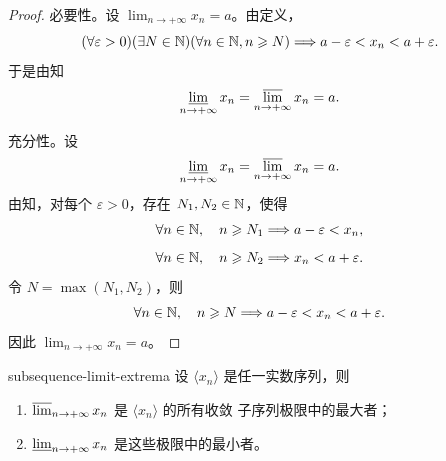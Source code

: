 \begin{proof}
必要性。设 \(\lim_{n\to+\infty}x_n=a\)。由定义，
\[
(\forall\varepsilon>0)(\exists N\in\mathbb{N})(\forall n\in\mathbb{N}, n\geqslant N)
\Longrightarrow a-\varepsilon<x_n<a+\varepsilon.
\]
于是由知
\[
\varliminf_{n\to+\infty}x_n
=\varlimsup_{n\to+\infty}x_n=a.
\]

充分性。设
\[
\varliminf_{n\to+\infty}x_n
=\varlimsup_{n\to+\infty}x_n=a.
\]
由知，对每个
\(\varepsilon>0\)，存在 \(N_1,N_2\in\mathbb{N}\)，使得
\[
\forall n\in\mathbb{N},\quad n\geqslant N_1\Longrightarrow a-\varepsilon<x_n,
\]
\[
\forall n\in\mathbb{N},\quad n\geqslant N_2\Longrightarrow x_n<a+\varepsilon.
\]
令 \(N=\max(N_1,N_2)\)，则
\[
\forall n\in\mathbb{N},\quad n\geqslant N
\Longrightarrow a-\varepsilon<x_n<a+\varepsilon.
\]
因此 \(\lim_{n\to+\infty}x_n=a\)。
\end{proof}

\begin{mythm}{}{subsequence-limit-extrema}
设 \(\langle x_n\rangle\) 是任一实数序列，则
\begin{enumerate}[label=\arabic*)]
  \item \(\varlimsup_{n\to+\infty}x_n\) 是 \(\langle x_n\rangle\) 的所有收敛
  子序列极限中的最大者；
  \item \(\varliminf_{n\to+\infty}x_n\) 是这些极限中的最小者。
\end{enumerate}
\end{mythm}

